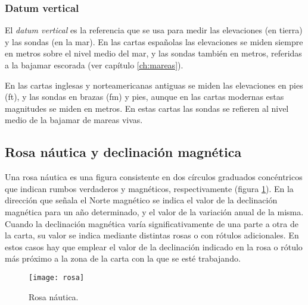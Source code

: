 \subsubsection{Datum vertical }


El \emph{datum vertical} es la referencia que se usa para medir las elevaciones (en tierra) y las 
sondas (en la mar). En las cartas españolas las elevaciones se miden siempre en metros 
sobre el nivel medio del mar, y las sondas también en metros, referidas a la bajamar 
escorada (ver capítulo \ref{ch:mareas}). 

En las cartas inglesas y norteamericanas antiguas se miden las elevaciones en pies (ft),%
 y las sondas en brazas (fm)%
 y pies, aunque en las cartas modernas estas magnitudes se 
miden en metros. En estas cartas las sondas se refieren al nivel medio de la bajamar de 
mareas vivas. 

\subsection{Rosa náutica y declinación magnética}


Una rosa náutica es una figura consistente en dos círculos graduados concéntricos que indican 
rumbos verdaderos y magnéticos, respectivamente (figura \ref{fg:rosa}). 
En la dirección que señala el Norte magnético se indica el valor de la declinación magnética 
para un año determinado, y el valor de la variación anual de la misma. 
Cuando la declinación magnética varía significativamente de una parte a otra de la 
carta, su valor se indica mediante distintas rosas o con rótulos adicionales. En estos casos 
hay que emplear el valor de la declinación indicado en la rosa o rótulo más próximo a la 
zona de la carta con la que se esté trabajando. 

\begin{figure}[htbp]
\begin{center}
\texttt{[image: rosa]}\\
\caption{Rosa náutica.}
\label{fg:rosa}
\end{center}
\end{figure}

